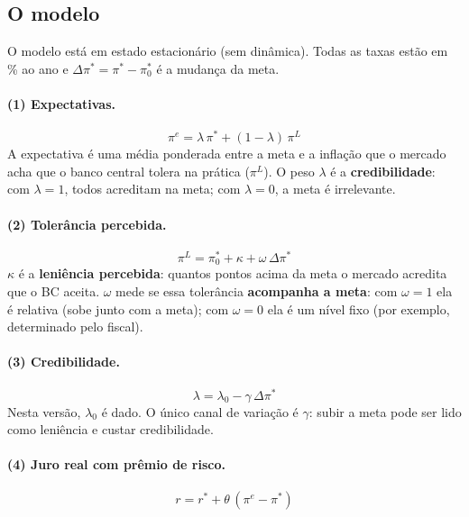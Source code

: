 \documentclass[11pt,a4paper]{article}
\newcommand{\pe}{\pi^{e}}
\newcommand{\meta}{\pi^{*}}
\newcommand{\dmeta}{\Delta\meta}
\begin{document}
\subsection{O modelo}

O modelo está em estado estacionário (sem dinâmica). Todas as taxas estão em \% ao ano e $\dmeta = \meta - \meta_0$ é a mudança da meta.

\paragraph{(1) Expectativas.}
\begin{equation}
\pe = \lambda\,\meta + (1-\lambda)\,\pi^{L}
\end{equation}
A expectativa é uma média ponderada entre a meta e a inflação que o mercado acha que o banco central tolera na prática ($\pi^{L}$). O peso $\lambda$ é a \textbf{credibilidade}: com $\lambda=1$, todos acreditam na meta; com $\lambda=0$, a meta é irrelevante.

\paragraph{(2) Tolerância percebida.}
\begin{equation}
\pi^{L} = \meta_0 + \kappa + \omega\,\dmeta
\end{equation}
$\kappa$ é a \textbf{leniência percebida}: quantos pontos acima da meta o mercado acredita que o BC aceita. $\omega$ mede se essa tolerância \textbf{acompanha a meta}: com $\omega=1$ ela é relativa (sobe junto com a meta); com $\omega=0$ ela é um nível fixo (por exemplo, determinado pelo fiscal).

\paragraph{(3) Credibilidade.}
\begin{equation}
\lambda = \lambda_0 - \gamma\,\dmeta
\end{equation}
Nesta versão, $\lambda_0$ é dado. O único canal de variação é $\gamma$: subir a meta pode ser lido como leniência e custar credibilidade.

\paragraph{(4) Juro real com prêmio de risco.}
\begin{equation}
r = r^{*} + \theta\,(\pe - \meta)
\end{equation}
\end{document}
